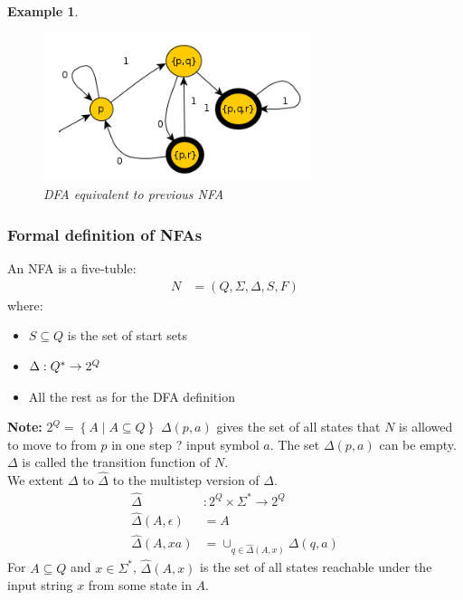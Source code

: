 \documentclass[a4paper]{article}
\newtheorem{example}{Example}
\begin{document}
\begin{example}
    \begin{figure}[H]
        \centering
        \includegraphics[width=0.7\textwidth]{example-5-2.png}
        \caption{DFA equivalent to previous NFA}
    \end{figure}
\end{example}
    \subsubsection{Formal definition of NFAs}
    An NFA is a five-tuble:
    \begin{align*}
        N&=\left( Q,\Sigma,\Delta,S,F \right)
    \end{align*}
    where:
    \begin{itemize}
        \item $S\subseteq Q$ is the set of start sets
        \item $\Delta: Q\time\Sigma^*\rightarrow 2^Q$
        \item All the rest as for the DFA definition
    \end{itemize}
    \textbf{Note:} $2^Q=\left\{ A\middle | A\subseteq Q \right\}$
        $\Delta(p,a)$ gives the set of all states that $N$ is allowed
        to move to from $p$ in one step ? input symbol $a$. The set $\Delta(p,a)$
        can be empty.\\
        $\Delta$ is called the transition function of $N$.
        \\We extent $\Delta$ to $\hat{\Delta}$ to the multistep version of $\Delta$.
        \begin{align*}
            \hat{\Delta}&:2^Q\times \Sigma^* \rightarrow 2^Q\\
            \hat{\Delta}(A,\epsilon)&=A\\
            \hat{\Delta}(A,xa)&=\cup_{q\in\hat{\Delta}(A,x)}\Delta(q,a)
        \end{align*}
        For $A\subseteq Q$ and $x\in\Sigma^*$, $\hat{\Delta}(A,x)$ is the set
        of all states reachable under the input string $x$ from some state in $A$.
\end{document}
